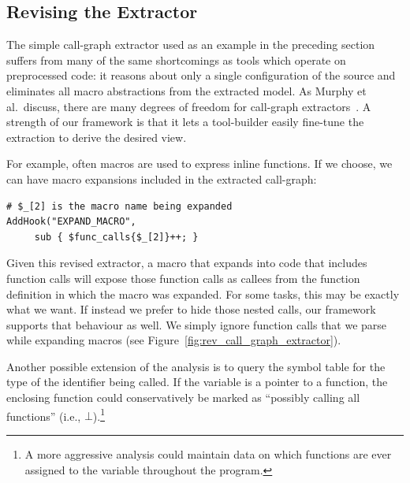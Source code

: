 \documentclass{article}
\newcommand{\ie}{i.e.,}
\begin{document}
\subsection{Revising the Extractor}
\label{sec:call_graph_revised}
The simple call-graph extractor used as an example in the preceding
section suffers from many of the same shortcomings as tools which
operate on preprocessed code: it reasons about only a single
configuration of the source and eliminates all macro abstractions
from the extracted model.  As Murphy et al.\ discuss, there are many
degrees of freedom for call-graph extractors~\cite{Murphy98}.  A
strength of our framework is that it lets a tool-builder easily
fine-tune the extraction to derive the desired view.

For example, often macros are used to express inline functions.  If we
choose, we can have macro expansions included in the extracted
call-graph:

\begin{verbatim}
# $_[2] is the macro name being expanded
AddHook("EXPAND_MACRO", 
     sub { $func_calls{$_[2]}++; }
\end{verbatim}

\noindent Given this revised extractor, a macro that expands into code
that includes function calls will expose those function calls as callees
from the function definition in which the macro was expanded.  For some
tasks, this may be exactly what we want.  If instead we prefer to hide
those nested calls, our framework supports that behaviour as well.  We
simply ignore function calls that we parse while expanding macros (see
Figure~\ref{fig:rev_call_graph_extractor}).

Another possible extension of the analysis is to query the symbol table
for the type of the identifier being called.  If the variable is a
pointer to a function, the enclosing function could conservatively be
marked as ``possibly calling all functions'' (\ie{} $\bot$).\footnote{A more
aggressive analysis could maintain data on which functions
are ever assigned to the variable throughout the program.}
\end{document}
